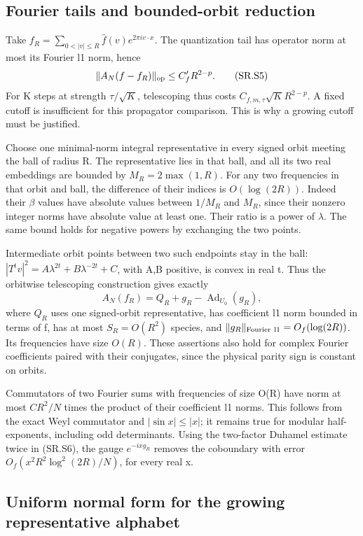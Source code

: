 \subsection{Fourier tails and bounded-orbit reduction}\label{smooth:fourier-tails-and-bounded-orbit-reduction}

Take \(f_R=\sum_{0<|v|\leq R}\widehat f(v)e^{2\pi iv\cdot x}\). The quantization tail has operator norm at most its Fourier l1 norm, hence \[
 \|A_N(f-f_R)\|_{\rm op}\leq C'_f R^{2-p}.                   \tag{SR.S5}
\] For K steps at strength \(\tau/\sqrt K\), telescoping thus costs \(C_{f,m,\tau}\sqrt K R^{2-p}\). A fixed cutoff is insufficient for this propagator comparison. This is why a growing cutoff must be justified.

Choose one minimal-norm integral representative in every signed orbit meeting the ball of radius R. The representative lies in that ball, and all its two real embeddings are bounded by \(M_R=2\max(1,R)\). For any two frequencies in that orbit and ball, the difference of their indices is \(O(\log(2R))\). Indeed their \(\beta\) values have absolute values between \(1/M_R\) and \(M_R\), since their nonzero integer norms have absolute value at least one. Their ratio is a power of \(\lambda\). The same bound holds for negative powers by exchanging the two points.

Intermediate orbit points between two such endpoints stay in the ball: \(|T^tv|^2=A\lambda^{2t}+B\lambda^{-2t}+C\), with A,B positive, is convex in real t. Thus the orbitwise telescoping construction gives exactly \[
 A_N(f_R)=Q_R+g_R-\operatorname{Ad}_{U_0}(g_R),                 \tag{SR.S6}
\] where \(Q_{R}\) uses one signed-orbit representative, has coefficient l1 norm bounded in terms of f, has at most \(S_R=O(R^2)\) species, and \(\|g_R\|_{\rm Fourier\ l1}=O_f(\log(2R))\). Its frequencies have size \(O(R)\). These assertions also hold for complex Fourier coefficients paired with their conjugates, since the physical parity sign is constant on orbits.

Commutators of two Fourier sums with frequencies of size O(R) have norm at most \(C R^2/N\) times the product of their coefficient l1 norms. This follows from the exact Weyl commutator and \(|\sin x|\leq|x|\); it remains true for modular half-exponents, including odd determinants. Using the two-factor Duhamel estimate twice in (SR.S6), the gauge \(e^{-ixg_R}\) removes the coboundary with error \(O_f(x^2R^2\log^2(2R)/N)\), for every real x.

\subsection{Uniform normal form for the growing representative alphabet}\label{smooth:uniform-normal-form-for-the-growing-representative-alphabet}

